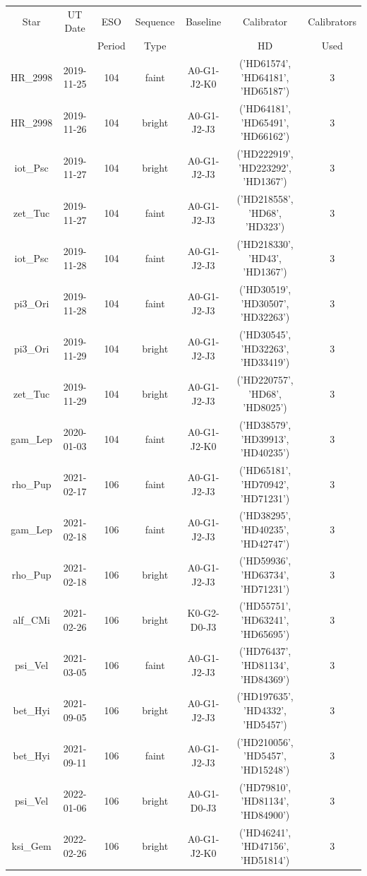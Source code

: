 \begin{tabular}{ccccccc}
\hline
Star & UT Date & ESO & Sequence & Baseline & Calibrator & Calibrators \\
 &  & Period & Type &  & HD & Used \\
\hline
HR_2998 & 2019-11-25 & 104 & faint & A0-G1-J2-K0 & ('HD61574', 'HD64181', 'HD65187') & 3 \\
HR_2998 & 2019-11-26 & 104 & bright & A0-G1-J2-J3 & ('HD64181', 'HD65491', 'HD66162') & 3 \\
iot_Psc & 2019-11-27 & 104 & bright & A0-G1-J2-J3 & ('HD222919', 'HD223292', 'HD1367') & 3 \\
zet_Tuc & 2019-11-27 & 104 & faint & A0-G1-J2-J3 & ('HD218558', 'HD68', 'HD323') & 3 \\
iot_Psc & 2019-11-28 & 104 & faint & A0-G1-J2-J3 & ('HD218330', 'HD43', 'HD1367') & 3 \\
pi3_Ori & 2019-11-28 & 104 & faint & A0-G1-J2-J3 & ('HD30519', 'HD30507', 'HD32263') & 3 \\
pi3_Ori & 2019-11-29 & 104 & bright & A0-G1-J2-J3 & ('HD30545', 'HD32263', 'HD33419') & 3 \\
zet_Tuc & 2019-11-29 & 104 & bright & A0-G1-J2-J3 & ('HD220757', 'HD68', 'HD8025') & 3 \\
gam_Lep & 2020-01-03 & 104 & faint & A0-G1-J2-K0 & ('HD38579', 'HD39913', 'HD40235') & 3 \\
rho_Pup & 2021-02-17 & 106 & faint & A0-G1-J2-J3 & ('HD65181', 'HD70942', 'HD71231') & 3 \\
gam_Lep & 2021-02-18 & 106 & faint & A0-G1-J2-J3 & ('HD38295', 'HD40235', 'HD42747') & 3 \\
rho_Pup & 2021-02-18 & 106 & bright & A0-G1-J2-J3 & ('HD59936', 'HD63734', 'HD71231') & 3 \\
alf_CMi & 2021-02-26 & 106 & bright & K0-G2-D0-J3 & ('HD55751', 'HD63241', 'HD65695') & 3 \\
psi_Vel & 2021-03-05 & 106 & faint & A0-G1-J2-J3 & ('HD76437', 'HD81134', 'HD84369') & 3 \\
bet_Hyi & 2021-09-05 & 106 & bright & A0-G1-J2-J3 & ('HD197635', 'HD4332', 'HD5457') & 3 \\
bet_Hyi & 2021-09-11 & 106 & faint & A0-G1-J2-J3 & ('HD210056', 'HD5457', 'HD15248') & 3 \\
psi_Vel & 2022-01-06 & 106 & bright & A0-G1-D0-J3 & ('HD79810', 'HD81134', 'HD84900') & 3 \\
ksi_Gem & 2022-02-26 & 106 & bright & A0-G1-J2-K0 & ('HD46241', 'HD47156', 'HD51814') & 3 \\

\end{tabular}

